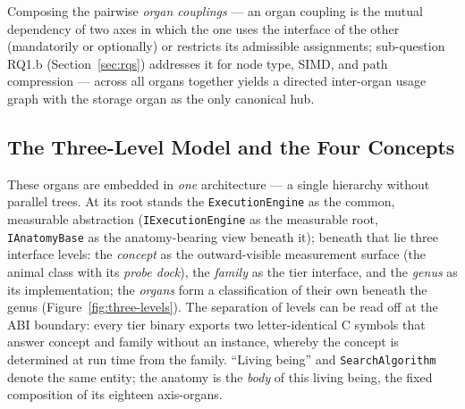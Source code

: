 \begin{nurlang}
\begin{figure}[htbp]
\end{figure}
\end{nurlang}
\begin{nurkurz}
Composing the pairwise \emph{organ couplings} --- an organ coupling is the mutual dependency of two axes
in which the one uses the interface of the other (mandatorily or optionally) or restricts its admissible
assignments; sub-question RQ1.b (Section~\ref{sec:rqs}) addresses it for node type, SIMD, and path
compression --- across all organs together yields a directed inter-organ usage graph with the storage
organ as the only canonical hub.
\subsection{The Three-Level Model and the Four Concepts}\label{sec:anatomy-levels}
These organs are embedded in \emph{one} architecture --- a single hierarchy without parallel trees. At its
root stands the \texttt{ExecutionEngine} as the common, measurable abstraction (\texttt{IExecutionEngine}
as the measurable root, \texttt{IAnatomyBase} as the anatomy-bearing view beneath it); beneath that lie
three interface levels: the \emph{concept} as the outward-visible measurement surface (the animal class
with its \emph{probe dock}), the \emph{family} as the tier interface, and the \emph{genus} as its
implementation; the \emph{organs} form a classification of their own beneath the genus
(Figure~\ref{fig:three-levels}). The separation of levels can be read off at the ABI boundary: every tier
binary exports two letter-identical C symbols that answer concept and family without an instance, whereby
the concept is determined at run time from the family\@. \enquote{Living being} and \texttt{SearchAlgorithm} denote the
same entity; the anatomy is the \emph{body} of this living being, the fixed composition of its eighteen
axis-organs.
\begin{figure}[htbp]\centering
{}
\end{figure}
\end{nurkurz}
